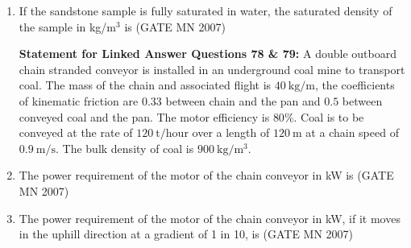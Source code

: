 \documentclass[journal]{IEEEtran}
\begin{document}
\begin{enumerate}
    \item If the sandstone sample is fully saturated in water, the saturated density of the sample in kg/m$^3$ is  
	    \hfill (GATE MN 2007)
    \begin{enumerate}
    \end{enumerate}



\textbf{Statement for Linked Answer Questions 78 \& 79:} A double outboard chain stranded conveyor is installed in an underground coal mine to transport coal. 
The mass of the chain and associated flight is $40 \ \mathrm{kg/m}$, the coefficients of kinematic friction are $0.33$ between chain and the pan and $0.5$ between conveyed coal and the pan. 
The motor efficiency is $80\%$. 
Coal is to be conveyed at the rate of $120 \ \mathrm{t/hour}$ over a length of $120 \ \mathrm{m}$ at a chain speed of $0.9 \ \mathrm{m/s}$. 
The bulk density of coal is $900 \ \mathrm{kg/m^3}$.
\item The power requirement of the motor of the chain conveyor in kW is  
	\hfill (GATE MN 2007)
\begin{enumerate}
\end{enumerate}


\item The power requirement of the motor of the chain conveyor in kW, if it moves in the uphill direction at a gradient of 1 in 10, is 
	\hfill (GATE MN 2007)
\begin{enumerate}
\end{enumerate}


\end{enumerate}
\end{document}
